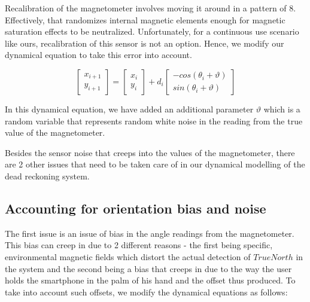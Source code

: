 Recalibration of the magnetometer involves moving it around in a pattern of 8.
Effectively, that randomizes internal magnetic elements enough for magnetic
saturation effects to be neutralized. Unfortunately, for a continuous use
scenario like ours, recalibration of this sensor is not an option. Hence, we
modify our dynamical equation to take this error into account.

\begin{equation}
\begin{bmatrix}x_{i+1}\\
y_{i+1}
\end{bmatrix} = \begin{bmatrix}x_{i}\\
y_{i}
\end{bmatrix}  + d{}_{i} \begin{bmatrix}-cos(\theta_{i}+\vartheta)\\
sin(\theta_{i}+\vartheta)
\end{bmatrix} 
\end{equation}

In this dynamical equation, we have added an additional parameter $\vartheta$ which is a random variable that represents random white noise in the reading from the true value of the magnetometer.

Besides the sensor noise that creeps into the values of the magnetometer, there are 2 other issues that need to be taken care of in our dynamical modelling of the dead reckoning system.

\subsection{Accounting for orientation bias and noise}

The first issue is an issue of bias in the angle readings from the magnetometer. This bias can creep in due to 2 different reasons - the first being specific, environmental magnetic fields which distort the actual detection of $TrueNorth$  in the system and the second being a bias that creeps in due to the way the user holds the smartphone in the palm of his hand and the offset thus produced. To take into account such offsets, we modify the dynamical equations as follows:

